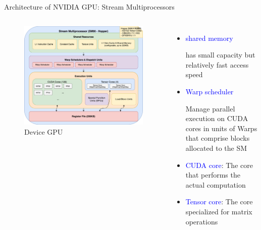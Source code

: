 \documentclass[dvipdfmx, 11pt, aspectratio=169]{beamer}   %
\begin{document}
\begin{frame}{Architecture of NVIDIA GPU: Stream Multiprocessors}
\vspace{-\baselineskip}
\begin{columns}
  \vspace{\baselineskip}
  \begin{figure}
    \includegraphics[scale=0.07]{img/sm90.png}
    \caption{Device GPU}
  \end{figure}
  {\footnotesize
  \begin{itemize}
    \item \textcolor{blue}{shared memory}
    
    has small capacity but relatively fast access speed
    \item \textcolor{blue}{Warp scheduler}

    Manage parallel execution on CUDA cores in units of Warps that comprise blocks allocated to the SM
    \item \textcolor{blue}{CUDA core}: The core that performs the actual computation
    \item \textcolor{blue}{Tensor core}: The core specialized for matrix operations
  \end{itemize}
  }
\end{columns}
\end{frame}
\end{document}
